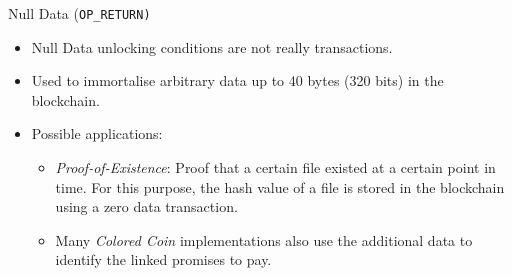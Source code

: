 \documentclass[]{beamer}
\begin{document}
\begin{frame}{Null Data (\texttt{OP\_RETURN)}}
\begin{itemize}
  \item<1-> Null Data unlocking conditions are not really transactions.
  \item<2-> Used to immortalise arbitrary data up to 40 bytes (320 bits) in the blockchain.
  \item<3-> Possible applications: 
    \begin{itemize}
      \item<3-> \textit{Proof-of-Existence}: Proof that a certain file existed at a certain point in time. For this purpose, the hash value of a file is stored in the blockchain using a zero data transaction.
      \item<3-> Many \textit{Colored Coin} implementations also use the additional data to identify the linked promises to pay.
    \end{itemize}
\end{itemize}
\end{frame}
\end{document}
